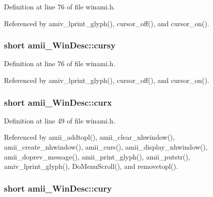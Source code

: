Definition at line 76 of file winami.\+h.



Referenced by amiv\+\_\+lprint\+\_\+glyph(), cursor\+\_\+off(), and cursor\+\_\+on().

\hypertarget{structamii__WinDesc_a25574bc64eeaecb522e78f5c636da887}{
\subsubsection[{cursy}]{\setlength{\rightskip}{0pt plus 5cm}short amii\+\_\+\+Win\+Desc\+::cursy}}\label{structamii__WinDesc_a25574bc64eeaecb522e78f5c636da887}


Definition at line 76 of file winami.\+h.



Referenced by amiv\+\_\+lprint\+\_\+glyph(), cursor\+\_\+off(), and cursor\+\_\+on().

\hypertarget{structamii__WinDesc_a4ae862475cf0a2f6aed98394d3ac12bd}{
\subsubsection[{curx}]{\setlength{\rightskip}{0pt plus 5cm}short amii\+\_\+\+Win\+Desc\+::curx}}\label{structamii__WinDesc_a4ae862475cf0a2f6aed98394d3ac12bd}


Definition at line 49 of file winami.\+h.



Referenced by amii\+\_\+addtopl(), amii\+\_\+clear\+\_\+nhwindow(), amii\+\_\+create\+\_\+nhwindow(), amii\+\_\+curs(), amii\+\_\+display\+\_\+nhwindow(), amii\+\_\+doprev\+\_\+message(), amii\+\_\+print\+\_\+glyph(), amii\+\_\+putstr(), amiv\+\_\+lprint\+\_\+glyph(), Do\+Menu\+Scroll(), and removetopl().

\hypertarget{structamii__WinDesc_aee07cf405ea0e78eb6b82c339360a0f8}{
\subsubsection[{cury}]{\setlength{\rightskip}{0pt plus 5cm}short amii\+\_\+\+Win\+Desc\+::cury}}\label{structamii__WinDesc_aee07cf405ea0e78eb6b82c339360a0f8}


